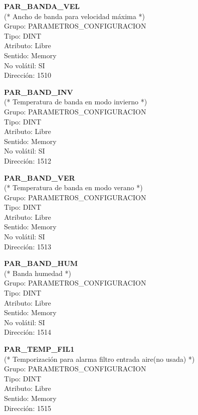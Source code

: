 \vspace{10mm}

\textbf{PAR\_BANDA\_VEL}\\(* Ancho de banda para velocidad máxima *)\\Grupo: PARAMETROS\_CONFIGURACION\\Tipo: DINT\\Atributo: Libre\\Sentido: Memory\\No volátil: SI\\Dirección: 1510

\vspace{10mm}

\textbf{PAR\_BAND\_INV}\\(* Temperatura de banda en modo invierno *)\\Grupo: PARAMETROS\_CONFIGURACION\\Tipo: DINT\\Atributo: Libre\\Sentido: Memory\\No volátil: SI\\Dirección: 1512

\vspace{10mm}

\textbf{PAR\_BAND\_VER}\\(* Temperatura de banda en modo verano *)\\Grupo: PARAMETROS\_CONFIGURACION\\Tipo: DINT\\Atributo: Libre\\Sentido: Memory\\No volátil: SI\\Dirección: 1513

\vspace{10mm}

\textbf{PAR\_BAND\_HUM}\\(* Banda humedad *)\\Grupo: PARAMETROS\_CONFIGURACION\\Tipo: DINT\\Atributo: Libre\\Sentido: Memory\\No volátil: SI\\Dirección: 1514

\vspace{10mm}

\textbf{PAR\_TEMP\_FIL1}\\(* Temporización para alarma filtro entrada aire(no usada) *)\\Grupo: PARAMETROS\_CONFIGURACION\\Tipo: DINT\\Atributo: Libre\\Sentido: Memory\\  Dirección: 1515

